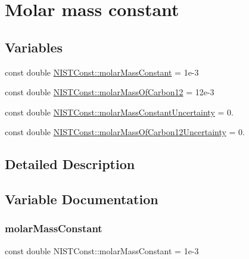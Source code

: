 \hypertarget{group___molar_mass_constant}{}\section{Molar mass constant}
\label{group___molar_mass_constant}
\subsection*{Variables}
\begin{DoxyCompactItemize}
\item 
const double \hyperlink{group___molar_mass_constant_ga83c1719df0cda1b4eae15de014b8f857}{N\+I\+S\+T\+Const\+::molar\+Mass\+Constant} = 1e-\/3
\item 
const double \hyperlink{group___molar_mass_constant_gab1aae3b38f21cb9a15fdc8209d3cf1f0}{N\+I\+S\+T\+Const\+::molar\+Mass\+Of\+Carbon12} = 12e-\/3
\item 
const double \hyperlink{group___molar_mass_constant_ga7aea373fd7ef8740aa22140aab339ce8}{N\+I\+S\+T\+Const\+::molar\+Mass\+Constant\+Uncertainty} = 0.
\item 
const double \hyperlink{group___molar_mass_constant_gae2fea17985c3e8877e1baab9f9382676}{N\+I\+S\+T\+Const\+::molar\+Mass\+Of\+Carbon12\+Uncertainty} = 0.
\end{DoxyCompactItemize}


\subsection{Detailed Description}


\subsection{Variable Documentation}
\mbox{\label{group___molar_mass_constant_ga83c1719df0cda1b4eae15de014b8f857}} 
\subsubsection{\texorpdfstring{molar\+Mass\+Constant}{molarMassConstant}}
{\footnotesize\ttfamily const double N\+I\+S\+T\+Const\+::molar\+Mass\+Constant = 1e-\/3}

